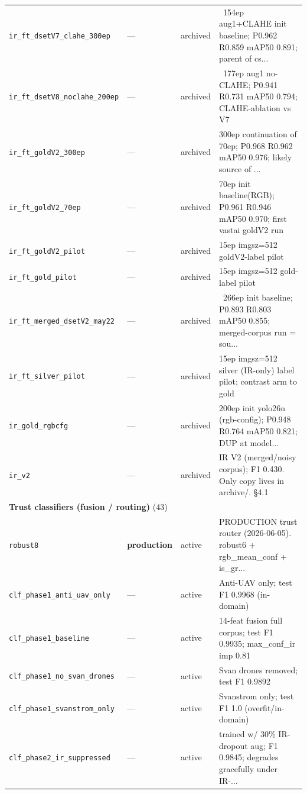 \documentclass[12pt,a4paper,oneside,openright]{book}
\begin{document}
\begin{longtable}{p{}llp{}}
\texttt{ir\_ft\_dsetV7\_clahe\_300ep} & --- & archived & ~154ep aug1+CLAHE init baseline; P0.962 R0.859 mAP50 0.891; parent of cs... \\
\texttt{ir\_ft\_dsetV8\_noclahe\_200ep} & --- & archived & ~177ep aug1 no-CLAHE; P0.941 R0.731 mAP50 0.794; CLAHE-ablation vs V7 \\
\texttt{ir\_ft\_goldV2\_300ep} & --- & archived & 300ep continuation of 70ep; P0.968 R0.962 mAP50 0.976; likely source of ... \\
\texttt{ir\_ft\_goldV2\_70ep} & --- & archived & 70ep init baseline(RGB); P0.961 R0.946 mAP50 0.970; first vastai goldV2 run \\
\texttt{ir\_ft\_goldV2\_pilot} & --- & archived & 15ep imgsz=512 goldV2-label pilot \\
\texttt{ir\_ft\_gold\_pilot} & --- & archived & 15ep imgsz=512 gold-label pilot \\
\texttt{ir\_ft\_merged\_dsetV2\_may22} & --- & archived & ~266ep init baseline; P0.893 R0.803 mAP50 0.855; merged-corpus run = sou... \\
\texttt{ir\_ft\_silver\_pilot} & --- & archived & 15ep imgsz=512 silver (IR-only) label pilot; contrast arm to gold \\
\texttt{ir\_gold\_rgbcfg} & --- & archived & 200ep init yolo26n (rgb-config); P0.948 R0.764 mAP50 0.821; DUP at model... \\
\texttt{ir\_v2} & --- & archived & IR V2 (merged/noisy corpus); F1 0.430. Only copy lives in archive/. §4.1 \\
\midrule
\multicolumn{4}{l}{\textbf{Trust classifiers (fusion / routing)} (43)} \\
\midrule
\texttt{robust8} & \textbf{production} & active & PRODUCTION trust router (2026-06-05). robust6 + rgb\_mean\_conf + is\_gr... \\
\texttt{clf\_phase1\_anti\_uav\_only} & --- & active & Anti-UAV only; test F1 0.9968 (in-domain) \\
\texttt{clf\_phase1\_baseline} & --- & active & 14-feat fusion full corpus; test F1 0.9935; max\_conf\_ir imp 0.81 \\
\texttt{clf\_phase1\_no\_svan\_drones} & --- & active & Svan drones removed; test F1 0.9892 \\
\texttt{clf\_phase1\_svanstrom\_only} & --- & active & Svanstrom only; test F1 1.0 (overfit/in-domain) \\
\texttt{clf\_phase2\_ir\_suppressed} & --- & active & trained w/ 30\% IR-dropout aug; F1 0.9845; degrades gracefully under IR-... \\

\end{longtable}
\end{document}
